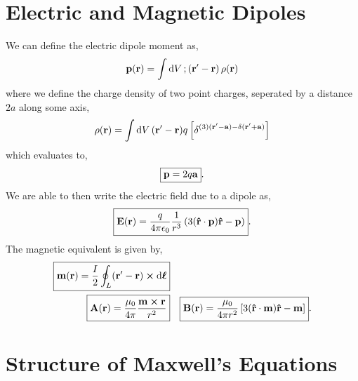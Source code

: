 \documentclass{book}
\begin{document}
\section{Electric and Magnetic Dipoles}
We can define the electric dipole moment as,
\begin{equation}
	\vb{p}(\vb{r}) = \int\dd{V};\left(\vb{r}'-\vb{r}\right)\rho(\vb{r})
\end{equation}
where we define the charge density of two point charges, seperated by a distance $2a$ along some axis,
\begin{equation}
	\rho(\vb{r}) = \int\dd{V}(\vb{r}'-\vb{r})q\left[\delta^{(3)(\vb{r}'-\vb{a}) - \delta(\vb{r}'+\vb{a})}\right]
\end{equation}
which evaluates to,
\begin{equation}
	\boxed{\vb{p} = 2q\vb{a}}.
\end{equation}
We are able to then write the electric field due to a dipole as,
\begin{equation}
	\boxed{\vb{E}(\vb{r})  = \frac{q}{4\pi \epsilon_0} \frac{1}{r^3}\left(3(\vu{r}\cdot\vb{p})\vu{r} - \vb{p}\right)}.
\end{equation}
The magnetic equivalent is given by,
\begin{align}
	\boxed{ \vb{m}(\vb{r}) = \frac{I}{2} \oint_L (\vb{r}' - \vb{r})\cross \dd{\vb*{\ell}} } \\
	\boxed{ \vb{A}(\vb{r}) = \frac{\mu_0}{4\pi}\frac{\vb{m} \cross \vb{r}}{r^2} } && \boxed{ \vb{B}(\vb{r}) = \frac{\mu_0}{4\pi r^2}\left[3(\vu{r}\cdot{\vb{m}})\vu{r}-\vb{m}\right] }.
\end{align}
\section{Structure of Maxwell's Equations}
\end{document}
